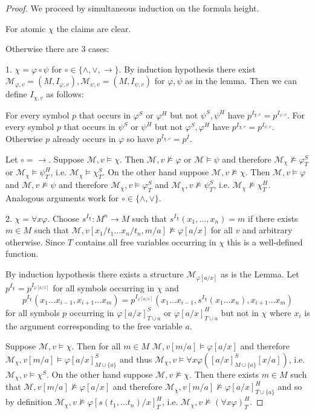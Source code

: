 \documentclass[a4paper,12pt]{report}
\theoremstyle{definition}
\theoremstyle{definition}
\theoremstyle{definition}
\theoremstyle{definition}
\theoremstyle{definition}
\theoremstyle{definition}
\theoremstyle{definition}
\begin{document}
	\begin{proof}
		We proceed by simultaneous induction on the formula height.
		
		For atomic $\chi$ the claims are clear.
		
		Otherwise there are $3$ cases:
		
		1. $\chi = \varphi\circ\psi$ for $\circ\in\{\wedge,\vee,\to\}$. By induction hypothesis there exist $\mathcal M_{\varphi, v} = (M, I_{\varphi, v}), \mathcal M_{\psi, v} = (M, I_{\psi, v})$ for $\varphi,\psi$ as in the lemma. Then we can define $I_{\chi, v}$ as follows:
		
		For every symbol $p$ that occurs in $\varphi^S$ or $\varphi^H$ but not $\psi^S, \psi^H$ have $p^{I_{\chi, v}} = p^{I_{\varphi, v}}$. For every symbol $p$ that occurs in $\psi^S$ or $\psi^H$ but not $\varphi^S, \varphi^H$ have $p^{I_{\chi, v}} = p^{I_{\psi, v}}$. Otherwise $p$ already occurs in $\varphi$ so have $p^{I_{\chi, v}} = p^I$.
		
		Let $\circ=\to$. Suppose $\mathcal M, v\models\chi$. Then $\mathcal M, v\not\models\varphi$ or $\mathcal M\models\psi$ and therefore $\mathcal M_\chi\not\models\varphi^S_T$ or $\mathcal M_\chi\models\psi^H_T$, i.e. $\mathcal M_\chi\models\chi^S_T$. On the other hand suppose $\mathcal M, v\not\models\chi$. Then $\mathcal M, v\models\varphi$ and $\mathcal M, v\not\models\psi$ and therefore $\mathcal M_\chi, v\models \varphi^S_T$ and $\mathcal M_\chi, v\not\models\psi^S_T$, i.e. $\mathcal M_\chi\not\models\chi^H_T$. Analogous arguments work for $\circ\in\{\wedge, \vee\}$.
		 
		2. $\chi = \forall x\varphi$. Choose $s^{I_\chi}:M^n\to M$ such that $s^{I_\chi}(x_1,\dots, x_n) = m$ if there exists $m\in M$ such that $\mathcal M, v[x_1/t_1\dots x_n/t_n, m/a]\not\models\varphi[a/x]$ for all $v$ and arbitrary otherwise. Since $T$ contains all free variables occurring in $\chi$ this is a well-defined function.
		 
		By induction hypothesis there exists a structure $\mathcal M_{\varphi[a/x]}$ as is the Lemma. Let $p^{I_\chi} = p^{I_{\varphi[a/x]}}$ for all symbols occurring in $\chi$ and $$p^{I_\chi}(x_1\dots x_{i-1}, x_{i+1}\dots x_m) = p^{I_{\varphi[a/x]}}(x_1\dots x_{i-1}, s^{I_\chi}(x_1\dots x_n), x_{i+1}\dots x_m)$$ for all symbols $p$ occurring in $\varphi[a/x]^S_{T\cup a}$ or $\varphi[a/x]^H_{T\cup a}$ but not in $\chi$ where $x_i$ is the argument corresponding to the free variable $a$.
		 
		Suppose $\mathcal M, v\models\chi$. Then for all $m\in M$ $\mathcal M, v[m/a]\models\varphi[a/x]$ and therefore $\mathcal M_{\chi}, v[m/a]\models\varphi[a/x]^S_{M\cup\{a\}}$ and thus $\mathcal M_{\chi}, v\models \forall x\varphi([a/x]^S_{M\cup\{a\}}[x/a])$, i.e. $\mathcal M_\chi,v\models \chi^S$. On the other hand suppose $\mathcal M, v\not\models\chi$. Then there exists $m\in M$ such that $\mathcal M, v[m/a]\not\models\varphi[a/x]$ and therefore $\mathcal M_\chi, v[m/a]\not\models\varphi[a/x]^H_{T\cup\{a\}}$ and so by definition $\mathcal M_\chi, v\not\models\varphi[s(t_1,\dots t_n)/x]^H_T$, i.e. $\mathcal M_\chi, v\not\models(\forall x\varphi)^H_T$.


\end{proof}
\end{document}
